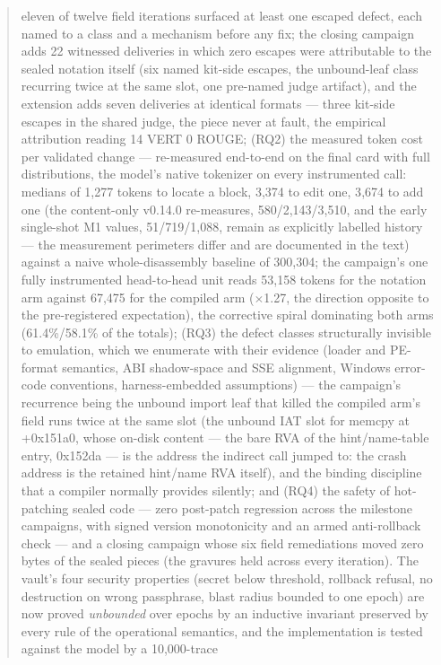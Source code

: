 \documentclass[11pt,a4paper]{article}
\begin{document}
\begin{abstract}
eleven of twelve field iterations surfaced at least one escaped defect,
each named to a class and a mechanism before any fix; the closing
campaign adds 22 witnessed deliveries in which zero escapes were
attributable to the sealed notation itself (six named kit-side escapes,
the unbound-leaf class recurring twice at the same slot, one pre-named
judge artifact), and the extension adds seven deliveries at identical
formats --- three kit-side escapes in the shared judge, the piece never
at fault, the empirical attribution reading 14 VERT 0 ROUGE; (RQ2) the measured
token cost per validated change --- re-measured end-to-end on the final
card with full distributions, the model's native tokenizer on every
instrumented call: medians of 1{,}277 tokens to locate a block, 3{,}374
to edit one, 3{,}674 to add one (the content-only v0.14.0 re-measures,
580/2{,}143/3{,}510, and the early single-shot M1 values, 51/719/1{,}088,
remain as explicitly labelled history --- the measurement perimeters
differ and are documented in the text) against a naive whole-disassembly
baseline of 300{,}304; the campaign's one fully instrumented
head-to-head unit reads 53{,}158 tokens for the notation arm against
67{,}475 for the compiled arm ($\times$1.27, the direction opposite to
the pre-registered expectation), the corrective spiral dominating both
arms (61.4\%/58.1\% of the totals);
(RQ3) the defect classes structurally invisible to emulation, which we
enumerate with their evidence (loader and PE-format semantics, ABI
shadow-space and SSE alignment, Windows error-code conventions,
harness-embedded assumptions) --- the campaign's recurrence being the
unbound import leaf that killed the compiled arm's field runs twice at
the same slot (the unbound IAT slot for memcpy at +0x151a0, whose
on-disk content --- the bare RVA of the hint/name-table entry, 0x152da
--- is the address the indirect call jumped to: the crash address is
the retained hint/name RVA itself), and the binding discipline that a
compiler normally provides silently; and (RQ4) the safety of hot-patching sealed
code --- zero post-patch regression across the milestone campaigns, with
signed version monotonicity and an armed anti-rollback check --- and a
closing campaign whose six field remediations moved zero bytes of the
sealed pieces (the gravures held across every iteration). The vault's four security properties (secret below threshold, rollback refusal, no destruction on wrong passphrase, blast radius bounded to one epoch) are now proved \emph{unbounded} over epochs by an inductive invariant preserved by every rule of the operational semantics, and the implementation is tested against the model by a 10{,}000-trace

\end{abstract}
\end{document}
